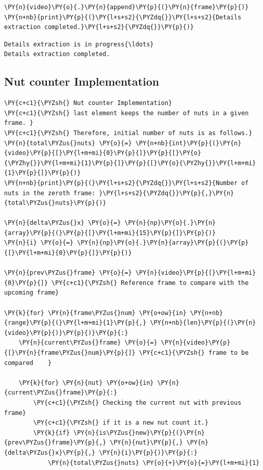 \documentclass[a4paper,11pt]{article}%
\begin{document}
\begin{tcolorbox}[breakable, size=fbox, boxrule=1pt, pad at break*=1mm,colback=cellbackground, colframe=cellborder]
\begin{Verbatim}[commandchars=\\\{\}]
    \PY{n}{video}\PY{o}{.}\PY{n}{append}\PY{p}{(}\PY{n}{frame}\PY{p}{)}
\PY{n+nb}{print}\PY{p}{(}\PY{l+s+s2}{\PYZdq{}}\PY{l+s+s2}{Details extraction completed.}\PY{l+s+s2}{\PYZdq{}}\PY{p}{)}
\end{Verbatim}
\end{tcolorbox}

    \begin{Verbatim}[commandchars=\\\{\}]
Details extraction is in progress{\ldots}
Details extraction completed.
    \end{Verbatim}
\pagebreak
\subsection{Nut counter Implementation}
    \begin{tcolorbox}[breakable, size=fbox, boxrule=1pt, pad at break*=1mm,colback=cellbackground, colframe=cellborder]
\begin{Verbatim}[commandchars=\\\{\}]
\PY{c+c1}{\PYZsh{} Nut counter Implementation}
\PY{c+c1}{\PYZsh{} last element keeps the number of nuts in a given frame. }
\PY{c+c1}{\PYZsh{} Therefore, initial number of nuts is as follows.}
\PY{n}{total\PYZus{}nuts} \PY{o}{=} \PY{n+nb}{int}\PY{p}{(}\PY{n}{video}\PY{p}{[}\PY{l+m+mi}{0}\PY{p}{]}\PY{p}{[}\PY{o}{\PYZhy{}}\PY{l+m+mi}{1}\PY{p}{]}\PY{p}{[}\PY{o}{\PYZhy{}}\PY{l+m+mi}{1}\PY{p}{]}\PY{p}{)}
\PY{n+nb}{print}\PY{p}{(}\PY{l+s+s2}{\PYZdq{}}\PY{l+s+s2}{Number of nuts in the zeroth frame: }\PY{l+s+s2}{\PYZdq{}}\PY{p}{,}\PY{n}{total\PYZus{}nuts}\PY{p}{)}

\PY{n}{delta\PYZus{}x} \PY{o}{=} \PY{n}{np}\PY{o}{.}\PY{n}{array}\PY{p}{(}\PY{p}{[}\PY{l+m+mi}{15}\PY{p}{]}\PY{p}{)}
\PY{n}{i} \PY{o}{=} \PY{n}{np}\PY{o}{.}\PY{n}{array}\PY{p}{(}\PY{p}{[}\PY{l+m+mi}{0}\PY{p}{]}\PY{p}{)}

\PY{n}{prev\PYZus{}frame} \PY{o}{=} \PY{n}{video}\PY{p}{[}\PY{l+m+mi}{0}\PY{p}{]} \PY{c+c1}{\PYZsh{} Reference frame to compare with the upcoming frame}

\PY{k}{for} \PY{n}{frame\PYZus{}num} \PY{o+ow}{in} \PY{n+nb}{range}\PY{p}{(}\PY{l+m+mi}{1}\PY{p}{,} \PY{n+nb}{len}\PY{p}{(}\PY{n}{video}\PY{p}{)}\PY{p}{)}\PY{p}{:}
    \PY{n}{current\PYZus{}frame} \PY{o}{=} \PY{n}{video}\PY{p}{[}\PY{n}{frame\PYZus{}num}\PY{p}{]} \PY{c+c1}{\PYZsh{} frame to be compared    }

    \PY{k}{for} \PY{n}{nut} \PY{o+ow}{in} \PY{n}{current\PYZus{}frame}\PY{p}{:}
        \PY{c+c1}{\PYZsh{} Checking the current nut with previous frame}
        \PY{c+c1}{\PYZsh{} if it is a new nut count it.}
        \PY{k}{if} \PY{n}{is\PYZus{}new}\PY{p}{(}\PY{n}{prev\PYZus{}frame}\PY{p}{,} \PY{n}{nut}\PY{p}{,} \PY{n}{delta\PYZus{}x}\PY{p}{,} \PY{n}{i}\PY{p}{)}\PY{p}{:}
            \PY{n}{total\PYZus{}nuts} \PY{o}{+}\PY{o}{=}\PY{l+m+mi}{1}


\end{Verbatim}
\end{tcolorbox}
\end{document}

